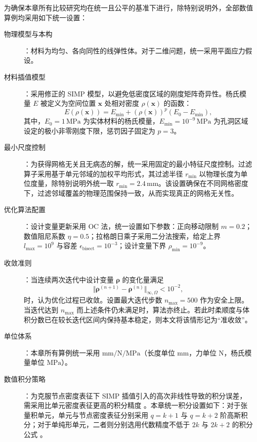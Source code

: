 为确保本章所有比较研究均在统一且公平的基准下进行，除特别说明外，全部数值算例均采用如下统一设置：
\begin{description}
	\item[物理模型与本构]：材料为均匀、各向同性的线弹性体。对于二维问题，统一采用平面应力假设。

	\item [材料插值模型]：采用修正的 SIMP 模型，以避免低密度区域的刚度矩阵奇异性。杨氏模量 $E$ 被定义为空间位置 $\boldsymbol{x}$ 处相对密度 $\rho(\boldsymbol{x})$ 的函数：
	\[
	E(\rho(\boldsymbol{x})) = E_{\min} + (\rho(\boldsymbol{x}))^p (E_0 - E_{\min}),
	\]
	其中，$E_0 = 1\,\mathrm{MPa}$ 为实体材料的杨氏模量，$E_{\min} = 10^{-9}\,\mathrm{MPa}$ 为孔洞区域设定的极小非零刚度下限，惩罚因子固定为 $p=3$。
	
	\item [最小尺度控制]：为获得网格无关且无病态的解，统一采用固定的最小特征尺度控制。过滤算子采用基于单元邻域的加权平均形式，其过滤半径 $r_{\min}$ 以物理长度为单位度量，除特别说明外统一取 $r_{\min} = 2.4\,\mathrm{mm}$。该设置确保在不同网格密度下，过滤邻域覆盖的物理范围保持一致，从而实现真正的网格无关性。
	
	\item [优化算法配置]：设计变量更新采用 OC 法，统一设置如下参数：正向移动限制 $m=0.2$；数值阻尼系数 $\eta=0.5$；拉格朗日乘子采用二分法搜索，给定上界 $l_{\max}=10^9$ 与容差 $\epsilon_{\text{bisect}}=10^{-3}$；设计变量下界 $\rho_{\min}=10^{-9}$。
		
	\item [收敛准则]：当连续两次迭代中设计变量 $\boldsymbol{\rho}$ 的变化量满足 
	\[
	\Vert\boldsymbol{\rho}^{(n+1)} - \boldsymbol{\rho}^{(n)}\Vert_{\infty,\Omega} < 10^{-2},
	\]
	时，认为优化过程已收敛。设置最大迭代步数 $n_{\max} = 500$ 作为安全上限。当迭代达到 $n_{\max}$ 而上述条件仍未满足时，算法亦终止。若此时柔顺度与体积分数已在较长迭代区间内保持基本稳定，则本文将该情形记为“准收敛”。
	
	\item [单位体系]：本章所有算例统一采用 $\mathrm{mm}/\mathrm{N}/\mathrm{MPa}$（长度单位 $\mathrm{mm}$，力单位 $\mathrm{N}$，杨氏模量单位 $\mathrm{MPa}$）。
	
	\item [数值积分策略]：为克服节点密度表征下 SIMP 插值引入的高次非线性导致的积分误差，需采用比单元密度表征更高的积分精度 。本章统一积分设置如下：对于张量积单元，单元与节点密度表征分别采用 $q=k+1$ 与 $q=k+2$ 阶高斯积分；对于单纯形单元，二者则分别选用代数精度不低于 $2k$ 与 $2k+2$ 的积分公式 。

\end{description}


